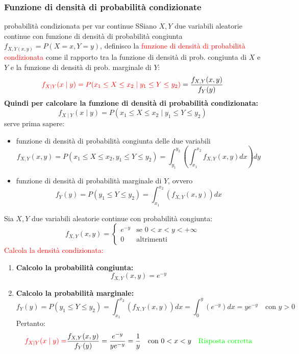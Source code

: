 \documentclass{article}  %
\theoremstyle{definition}
\begin{document}
\subsubsection{Funzione di densità di probabilità condizionate}
\begin{theorem}{probabilità condizionata per var continue}
	SSiano $X,Y$ due variabili aleatorie continue con funzione di densità di probabilità congiunta $f_{X,Y(x,y)}=P(X=x,Y=y)$, definisco la \textcolor{red}{funzione di densità di probabilità condizionata}
	come il rapporto tra la funzione di densità di prob. congiunta di $X$ e $Y$ e la funzione di densità di prob. marginale di $Y$:
	\[
		\textcolor{red}{f_{X \mid Y}(x \mid y)=P(x_1 \leq X \leq x_2 \mid y_1 \leq Y \leq y_2)}=\frac{f_{X,Y}(x,y)}{f_Y(y)}
	\]
	\textbf{Quindi per calcolare la funzione di densità di probabilità condizionata:}
	\[
		f_{X \mid Y}(x \mid y)=P(x_1 \leq X \leq x_2 \mid y_1 \leq Y \leq y_2)
	\]
	serve prima sapere:
	\begin{itemize}
		\item funzione di densità di probabilità congiunta delle due variabili
		      \[
			      f_{X,Y}(x,y)=P(x_1 \leq X \leq x_2 , y_1 \leq Y \leq y_2)=\int_{y_1}^{y_2}\left(\int_{x_1}^{x_2}f_{X,Y}(x,y) dx\right)dy
		      \]
		\item funzione di densità di probabilità marginale di $Y$, ovvero
		      \[
			      f_{Y}(y)=P(y_1 \leq Y \leq y_2)=\int_{x_1}^{x_2}(f_{X,Y}(x,y))dx
		      \]
	\end{itemize}
\end{theorem}
\begin{esercizio}[Esercizio]
	Sia $X,Y$ due variabili aleatorie continue con probabilità congiunta:
	\[
		f_{X,Y}(x,y) =
		\begin{cases}
			e^{-y} & \text{se } 0 < x < y < +\infty \\
			0      & \text{altrimenti}
		\end{cases}
	\]
	\textcolor{red}{Calcola la densità condizionata:}
	\begin{enumerate}
		\item \textbf{Calcolo la probabilità congiunta:}
		      \[
			      f_{X,Y}(x,y)=e^{-y}
		      \]
		\item \textbf{Calcolo la probabilità marginale:}
		      \[
			      f_{Y}(y)=P(y_1 \leq Y \leq y_2)=\int_{x_1}^{x_2}(f_{X,Y}(x,y))dx=\int_{0}^{y}(e^{-y})dx=ye^{-y} \quad \text{con } y>0
		      \]
		      Pertanto:
		      \[
			      \textcolor{red}{f_{X \mid Y}(x \mid y)=}\frac{f_{X,Y}(x,y)}{f_{Y}(y)}=\frac{e^{-y}}{ye^{-y}}=\frac{1}{y} \quad \text{con } 0<x<y \quad \textcolor{green}{\text{Risposta corretta}}
		      \]
	\end{enumerate}
\end{esercizio}
\end{document}
